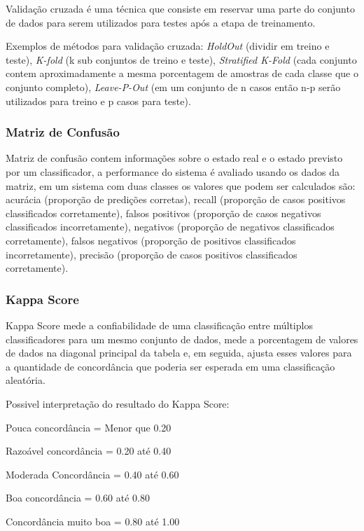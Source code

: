 \documentclass[12pt]{article}
\begin{document}
		Validação cruzada é uma técnica que consiste em reservar uma parte do conjunto de dados para serem utilizados para testes após a etapa de treinamento.
		
		Exemplos de métodos para validação cruzada: \emph{HoldOut} (dividir em treino e teste), \emph{K-fold} (k sub conjuntos de treino e teste), \emph{Stratified K-Fold} (cada conjunto contem aproximadamente a mesma porcentagem de amostras de cada classe que o conjunto completo), \emph{Leave-P-Out} (em um conjunto de n casos então n-p serão utilizados para treino e p casos para teste).
		
	\subsubsection{Matriz de Confusão}
	
		Matriz de confusão contem informações sobre o estado real e o estado previsto por um classificador, a performance do sistema é avaliado usando os dados da matriz, em um sistema com duas classes os valores que podem ser calculados são: acurácia (proporção de predições corretas), recall (proporção de casos positivos classificados corretamente), falsos positivos (proporção de casos negativos classificados incorretamente), negativos (proporção de negativos classificados corretamente), falsos negativos (proporção de positivos classificados incorretamente), precisão (proporção de casos positivos classificados corretamente).
		
	\subsubsection{Kappa Score}
	
	Kappa Score mede a confiabilidade de uma classificação entre múltiplos classificadores para um mesmo conjunto de dados, mede a porcentagem de valores de dados na diagonal principal da tabela e, em seguida, ajusta esses valores para a quantidade de concordância que poderia ser esperada em uma classificação aleatória.
	
	Possivel interpretação do resultado do Kappa Score:
	
	Pouca concordância = Menor que 0.20
	
	Razoável concordância = 0.20 até 0.40
	
	Moderada Concordância = 0.40 até 0.60
	
	Boa concordância = 0.60 até 0.80
	
	Concordância muito boa = 0.80 até 1.00	
		
\end{document}
